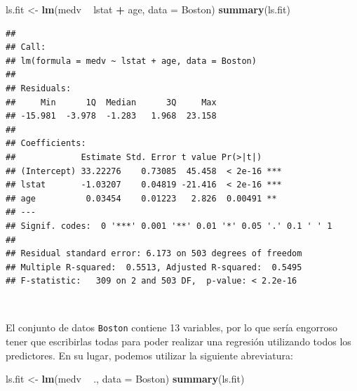 \documentclass[]{book}
\newenvironment{Shaded}{\begin{snugshade}}{\end{snugshade}}
\newcommand{\KeywordTok}[1]{\textcolor[rgb]{0.13,0.29,0.53}{\textbf{#1}}}
\newcommand{\DataTypeTok}[1]{\textcolor[rgb]{0.13,0.29,0.53}{#1}}
\newcommand{\StringTok}[1]{\textcolor[rgb]{0.31,0.60,0.02}{#1}}
\newcommand{\OperatorTok}[1]{\textcolor[rgb]{0.81,0.36,0.00}{\textbf{#1}}}
\newcommand{\NormalTok}[1]{#1}
\begin{document}
\begin{Shaded}
\begin{Highlighting}[]
\NormalTok{ls.fit <-}\StringTok{ }\KeywordTok{lm}\NormalTok{(medv }\OperatorTok{~}\StringTok{ }\NormalTok{lstat }\OperatorTok{+}\StringTok{ }\NormalTok{age, }\DataTypeTok{data =}\NormalTok{ Boston)}
\KeywordTok{summary}\NormalTok{(ls.fit)}
\end{Highlighting}
\end{Shaded}

\begin{verbatim}
## 
## Call:
## lm(formula = medv ~ lstat + age, data = Boston)
## 
## Residuals:
##     Min      1Q  Median      3Q     Max 
## -15.981  -3.978  -1.283   1.968  23.158 
## 
## Coefficients:
##             Estimate Std. Error t value Pr(>|t|)    
## (Intercept) 33.22276    0.73085  45.458  < 2e-16 ***
## lstat       -1.03207    0.04819 -21.416  < 2e-16 ***
## age          0.03454    0.01223   2.826  0.00491 ** 
## ---
## Signif. codes:  0 '***' 0.001 '**' 0.01 '*' 0.05 '.' 0.1 ' ' 1
## 
## Residual standard error: 6.173 on 503 degrees of freedom
## Multiple R-squared:  0.5513, Adjusted R-squared:  0.5495 
## F-statistic:   309 on 2 and 503 DF,  p-value: < 2.2e-16
\end{verbatim}

~

El conjunto de datos \texttt{Boston} contiene 13 variables, por lo que
sería engorroso tener que escribirlas todas para poder realizar una
regresión utilizando todos los predictores. En su lugar, podemos
utilizar la siguiente abreviatura:

\begin{Shaded}
\begin{Highlighting}[]
\NormalTok{ls.fit <-}\StringTok{ }\KeywordTok{lm}\NormalTok{(medv }\OperatorTok{~}\StringTok{ }\NormalTok{., }\DataTypeTok{data =}\NormalTok{ Boston)}
\KeywordTok{summary}\NormalTok{(ls.fit)}
\end{Highlighting}
\end{Shaded}
\end{document}
